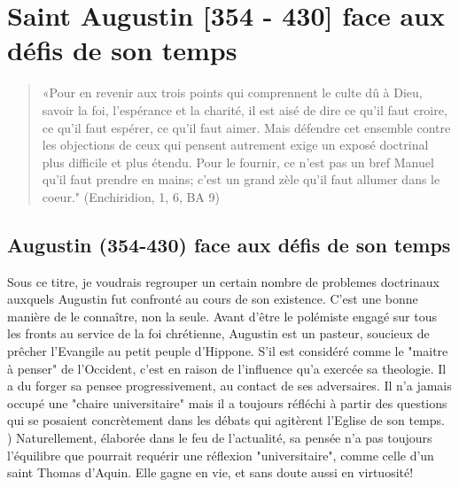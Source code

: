 \chapter{Saint Augustin [354 - 430] face aux défis de son temps}


 







 
\begin{quote}
    «Pour en revenir aux trois points qui comprennent le culte dû à Dieu, savoir la foi, l'espérance et la charité, il est aisé de dire ce qu'il faut croire, ce
qu'il faut espérer, ce qu'il faut aimer. Mais défendre cet ensemble contre les objections de ceux qui pensent autrement exige un exposé doctrinal plus difficile et plus étendu. Pour le fournir, ce n'est pas un bref Manuel qu'il faut prendre en mains; c'est
un grand zèle qu'il faut allumer dans le coeur." (Enchiridion, 1, 6, BA 9)
\end{quote}









 


\section{Augustin	(354-430)  face aux défis de son temps}

Sous ce titre, je voudrais regrouper un certain nombre de
problemes doctrinaux auxquels Augustin fut confronté au cours de son existence. C'est
une bonne manière de le connaître, non la seule. Avant d'être le polémiste engagé sur tous les fronts au service de la foi chrétienne, Augustin est un pasteur, soucieux de prêcher l'Evangile au petit peuple d'Hippone.	S'il est considéré comme le "maitre à penser" de l'Occident, c'est en raison de l'influence qu'a exercée sa theologie. Il a du forger sa pensee progressivement, au contact de ses adversaires. Il n'a jamais occupé une "chaire universitaire" mais il a toujours réfléchi à partir des questions
qui se posaient concrètement  dans les débats qui agitèrent l'Eglise de son temps.
)	Naturellement,	élaborée	dans le feu de l'actualité, sa pensée n'a pas	 toujours l'équilibre que pourrait requérir une réflexion "universitaire", comme celle d'un saint Thomas d'Aquin. Elle gagne en vie, et sans doute aussi en virtuosité!

